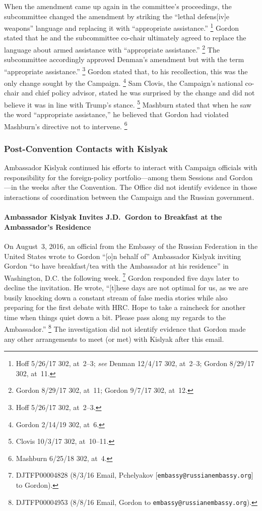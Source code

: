 When the amendment came up again in the committee's proceedings, the subcommittee changed the amendment by striking the ``lethal defens[iv]e weapons'' language and replacing it with ``appropriate assistance.''%
\footnote{Hoff 5/26/17 302, at~2--3;
\textit{see} Denman 12/4/17 302, at~2--3;
Gordon 8/29/17 302, at~11.}
Gordon stated that he and the subcommittee co-chair ultimately agreed to replace the language about armed assistance with ``appropriate assistance.''%
\footnote{Gordon 8/29/17 302, at~11;
Gordon 9/7/17 302, at~12.}
The subcommittee accordingly approved Denman's amendment but with the term ``appropriate assistance.''%
\footnote{Hoff 5/26/17 302, at~2--3.}
Gordon stated that, to his recollection, this was the only change sought by the Campaign.%
\footnote{Gordon 2/14/19 302, at~6.}
Sam Clovis, the Campaign's national co-chair and chief policy advisor, stated he was surprised by the change and did not believe it was in line with Trump's stance.%
\footnote{Clovis 10/3/17 302, at~10--11.}
Mashburn stated that when he saw the word ``appropriate assistance,'' he believed that Gordon had violated Mashburn's directive not to intervene.%
\footnote{Mashburn 6/25/18 302, at~4.}

\subsubsection{Post-Convention Contacts with Kislyak}

Ambassador Kislyak continued his efforts to interact with Campaign officials with responsibility for the foreign-policy portfolio---among them Sessions and Gordon---in the weeks after the Convention.
The Office did not identify evidence in those interactions of coordination between the Campaign and the Russian government.

\paragraph{Ambassador Kislyak Invites J.D.~Gordon to Breakfast at the Ambassador's Residence}

On August~3, 2016, an official from the Embassy of the Russian Federation in the United States wrote to Gordon ``[o]n behalf of\thinspace'' Ambassador Kislyak inviting Gordon ``to have breakfast/tea with the Ambassador at his residence'' in Washington, D.C. the following week.%
\footnote{DJTFP00004828 (8/3/16 Email, Pchelyakov [\verb+embassy@russianembassy.org+] to Gordon).}
Gordon responded five days later to decline the invitation.
He wrote, ``[t]hese days are not optimal for us, as we are busily knocking down a constant stream of false media stories while also preparing for the first debate with HRC\null.
Hope to take a raincheck for another time when things quiet down a bit.
Please pass along my regards to the Ambassador.''%
\footnote{DJTFP00004953 (8/8/16 Email, Gordon to \verb+embassy@russianembassy.org+).}
The investigation did not identify evidence that Gordon made any other arrangements to meet (or met) with Kislyak after this email.


